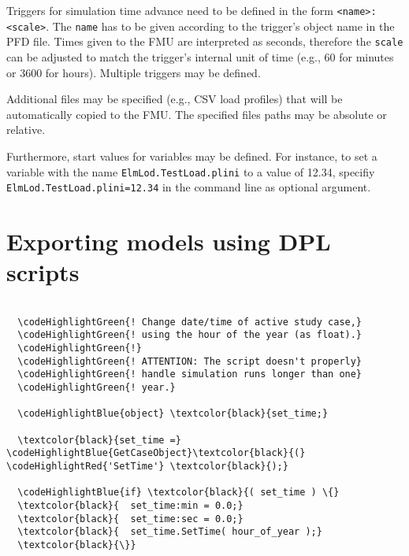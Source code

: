 Triggers for simulation time advance need to be defined in the form \texttt{<name>:<scale>}.
The \texttt{name} has to be given according to the trigger's object name in the PFD file.
Times given to the FMU are interpreted as seconds, therefore the \texttt{scale} can be adjusted to match the trigger's internal unit of time (e.g., 60 for minutes or 3600 for hours).
Multiple triggers may be defined.

Additional files may be specified (e.g., CSV load profiles) that will be automatically copied to the FMU. The specified files paths may be absolute or relative.

Furthermore, start values for variables may be defined. For instance, to set a variable with the name \texttt{ElmLod.TestLoad.plini} to a value of 12.34, specifiy \texttt{ElmLod.TestLoad.plini=12.34} in the command line as optional argument.



\section{Exporting models using DPL scripts}



\begin{Verbatim}[frame=single,commandchars=\\\{\}]

  \codeHighlightGreen{! Change date/time of active study case,}
  \codeHighlightGreen{! using the hour of the year (as float).}
  \codeHighlightGreen{!}
  \codeHighlightGreen{! ATTENTION: The script doesn't properly}
  \codeHighlightGreen{! handle simulation runs longer than one}
  \codeHighlightGreen{! year.}

  \codeHighlightBlue{object} \textcolor{black}{set_time;}

  \textcolor{black}{set_time =} \codeHighlightBlue{GetCaseObject}\textcolor{black}{(} \codeHighlightRed{'SetTime'} \textcolor{black}{);}

  \codeHighlightBlue{if} \textcolor{black}{( set_time ) \{}
  \textcolor{black}{  set_time:min = 0.0;}
  \textcolor{black}{  set_time:sec = 0.0;}
  \textcolor{black}{  set_time.SetTime( hour_of_year );}
  \textcolor{black}{\}}

\end{Verbatim}
